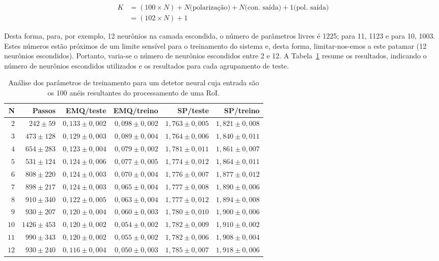 \begin{align}
K &= (100 \times N) + N \text{(polarização)} + N 
\text{(con. saída)} + 1 \text{(pol. saída)} \\
&= (102 \times N) + 1
\end{align}

Desta forma, para, por exemplo, 12 neurônios na camada escondida, o número de
parâmetros livres é 1225; para 11, 1123 e para 10, 1003. Estes números estão
próximos de um limite sensível para o treinamento do sistema e, desta forma,
limitar-nos-emos a este patamar (12 neurônios escondidos). Portanto, varia-se o
número de neurônios escondidos entre 2 e 12. A
Tabela~\ref{tab:ringer-param-optimization} resume os resultados, indicando o
número de neurônios escondidos utilizados e os resultados para cada agrupamento
de teste.

\begin{table}
\caption{Análise dos parâmetros de treinamento para um detetor neural cuja
entrada são os 100 anéis resultantes do processamento de uma RoI.}
\label{tab:ringer-param-optimization}
\begin{center}
\begin{tabular}{|r|r|r|r|r|r|} \hline
N & Passos & EMQ/teste & EMQ/treino & SP/teste & SP/treino \\ \hline 
$2$ & $242\pm59$ & $0,133\pm0,002$ & $0,098\pm0,002$ & $1,763\pm0,005$ &
$1,821\pm0,008$ \\ 
$3$ & $473\pm128$ & $0,129\pm0,003$ & $0,089\pm0,004$ & $1,764\pm0,006$ & $1,840
\pm0,011$ \\
$4$ & $654\pm283$ & $0,123\pm0,004$ & $0,079\pm0,002$ & $1,781\pm0,011$ & $1,861
\pm0,007$ \\
$5$ & $531\pm124$ & $0,124\pm0,006$ & $0,077\pm0,005$ & $1,774\pm0,012$ & $1,864
\pm0,011$ \\
$6$ & $808\pm220$ & $0,124\pm0,003$ & $0,070\pm0,004$ & $1,776\pm0,007$ & $1,877
\pm0,012$ \\
$7$ & $898\pm217$ & $0,124\pm0,003$ & $0,065\pm0,004$ & $1,777\pm0,008$ & $1,890
\pm0,006$ \\
$8$ & $910\pm340$ & $0,122\pm0,005$ & $0,063\pm0,004$ & $1,777\pm0,012$ & $1,894
\pm0,008$ \\
$9$ & $930\pm207$ & $0,120\pm0,004$ & $0,060\pm0,003$ & $1,780\pm0,010$ & $1,900
\pm0,006$ \\
$10$ & $1426\pm453$ & $0,120\pm0,002$ & $0,054\pm0,002$ & $1,782\pm0,009$ & $1,9
10\pm0,002$ \\
$11$ & $990\pm343$ & $0,120\pm0,002$ & $0,055\pm0,002$ & $1,782\pm0,006$ & $1,90
8\pm0,004$ \\
$12$ & $930\pm240$ & $0,116\pm0,004$ & $0,050\pm0,003$ & $1,785\pm0,007$ & $1,91
8\pm0,006$ \\
\hline
\end{tabular}
\end{center}
\end{table}

